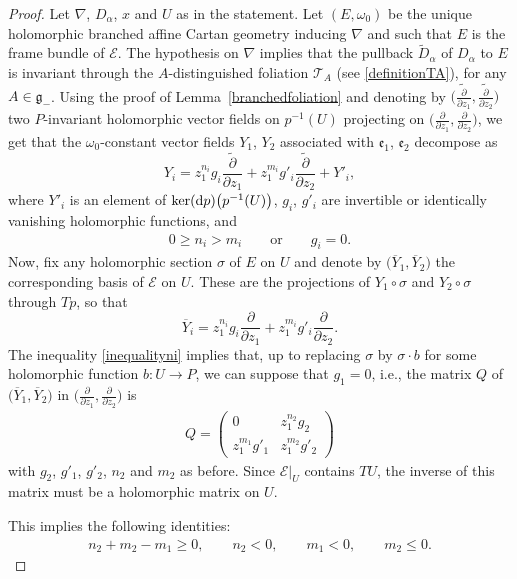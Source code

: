 \documentclass[10pt,a4paper]{amsart}
\newcommand{\der}[2]{\frac{\partial #1}{\partial#2}}
\numberwithin{equation}{section}
\begin{document}
\begin{proof} Let $\nabla$, $D_\alpha$, $x$ and $U$ as in the statement. Let $(E,\omega_0)$ be the unique holomorphic branched affine Cartan geometry inducing $\nabla$ and such that $E$ is the frame bundle of $\mathcal{E}$. The hypothesis on $\nabla$ implies that the pullback $\tilde{D}_\alpha$ of $D_\alpha$ to $E$ is invariant through the $A$-distinguished foliation $\mathcal{T}_A$ (see \eqref{definitionTA}), for any $A\in \mathfrak{g}_-$. Using the proof of Lemma~\ref{branchedfoliation} and denoting by $\big(\tilde{\der{}{z_1}},\tilde{\der{}{z_2}}\big)$ two $P$-invariant holomorphic vector fields on $p^{-1}(U)$ projecting on $\big(\der{}{z_1},\der{}{z_2}\big)$, we get that the $\omega_0$-constant vector fields $Y_1$, $Y_2$ associated with $\mathfrak{e}_1$, $\mathfrak{e}_2$ decompose as
\[ Y_i = z_1^{n_i}g_i \tilde{\der{}{z_1}} + z_1^{m_i}g'_i \tilde{\der{}{z_2}} + Y'_i,\]
 where $Y'_i$ is an element of $\ker({\rm d}p)\big(p^{-1}(U)\big)$, $g_i$, $g'_i$ are invertible or identically vanishing holomorphic functions, and
 \begin{gather}\label{inequalityni}
 0\geq n_i>m_i \qquad \text{or} \qquad g_i =0.\end{gather}
 Now, fix any holomorphic section $\sigma$ of $E$ on $U$ and denote by $\big(\overline{Y}_1,\overline{Y}_2\big)$ the corresponding basis of $\mathcal{E}$ on $U$. These are the projections of $Y_1\circ \sigma$ and $Y_2\circ \sigma$ through $Tp$, so that
\[\overline{Y}_i = z_1^{n_i}g_i \der{}{z_1} + z_1^{m_i}g'_i \der{}{z_2}.\]
 The inequality \eqref{inequalityni} implies that, up to replacing $\sigma$ by $\sigma\cdot b$ for some holomorphic function $b\colon U \longrightarrow P$, we can suppose that $g_1=0$, i.e., the matrix $Q$ of $\big(\overline{Y}_1,\overline{Y}_2\big)$ in $\big(\der{}{z_1},\der{}{z_2}\big)$ is
 \begin{gather*}Q= \begin{pmatrix} 0 & z_1^{n_2}g_2 \\ z_1^{m_1}g'_1 & z_1^{m_2}g'_2 \end{pmatrix} \end{gather*}
 with $g_2$, $g'_1$, $g'_2$, $n_2$ and $m_2$ as before. Since $\mathcal{E}\vert_U$ contains $TU$, the inverse of this matrix must be a holomorphic matrix on $U$.

 This implies the following identities:
 \begin{align}
 n_2+m_2-m_1 \geq 0,\qquad n_2 <0,\qquad m_1 < 0, \qquad
 m_2 \leq 0.\label{conditionsordres}
\end{align}


\end{proof}
\end{document}
